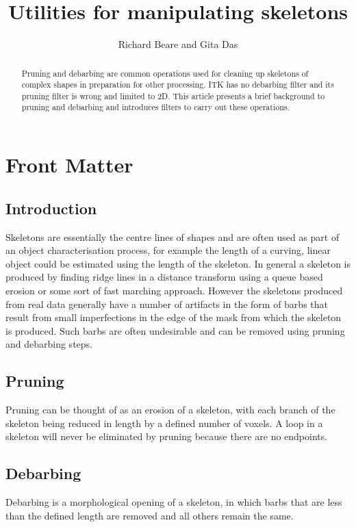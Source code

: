 \documentclass{InsightArticle}
\title{Utilities for manipulating skeletons}
\author{Richard Beare and Gita Das}
\begin{document}
\maketitle

\ifhtml
\chapter*{Front Matter\label{front}}
\fi


\begin{abstract}
\noindent
Pruning and debarbing are common operations used for cleaning up
skeletons of complex shapes in preparation for other processing. ITK
has no debarbing filter and its pruning filter is wrong and limited to
2D. This article presents a brief background to pruning and debarbing
and introduces filters to carry out these operations.
\end{abstract}

\tableofcontents

\section{Introduction}
Skeletons are essentially the centre lines of shapes and are often
used as part of an object characterisation process, for example the
length of a curving, linear object could be estimated using the length
of the skeleton. In general a skeleton is produced by finding ridge
lines in a distance transform using a queue based erosion or some sort
of fast marching approach. However the skeletons produced from real
data generally have a number of artifacts in the form of barbs that
result from small imperfections in the edge of the mask from which the
skeleton is produced. Such barbs are often undesirable and can be
removed using pruning and debarbing steps.

\section{Pruning}
Pruning can be thought of as an erosion of a skeleton, with each
branch of the skeleton being reduced in length by a defined number of
voxels. A loop in a skeleton will never be eliminated by pruning
because there are no endpoints.

\section{Debarbing}
Debarbing is a morphological opening of a skeleton, in which barbs
that are less than the defined length are removed and all others
remain the same.
\end{document}
